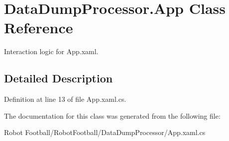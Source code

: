 \hypertarget{class_data_dump_processor_1_1_app}{\section{Data\-Dump\-Processor.\-App Class Reference}
\label{class_data_dump_processor_1_1_app}
}


Interaction logic for App.\-xaml.  




\subsection{Detailed Description}


Definition at line 13 of file App.\-xaml.\-cs.



The documentation for this class was generated from the following file\-:\begin{DoxyCompactItemize}
\item 
Robot Football/\-Robot\-Football/\-Data\-Dump\-Processor/App.\-xaml.\-cs\end{DoxyCompactItemize}
